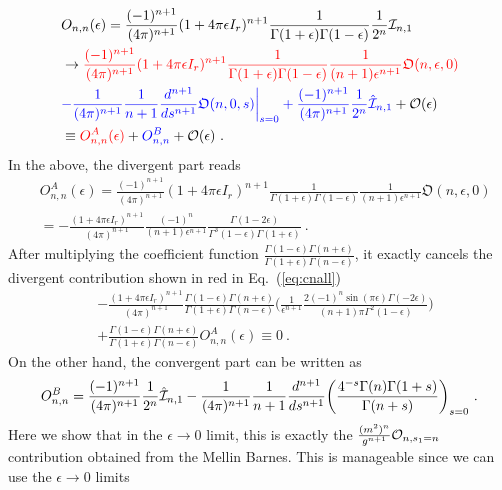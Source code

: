 \documentclass[a4paper,11pt]{article}
\begin{document}
\begin{align}
&O_{n,n}(\epsilon)=\frac{(-1)^{n+1}}{(4\pi)^{n+1}}(1+4\pi \epsilon I_r)^{n+1}\frac{1}{\Gamma(1+\epsilon)\Gamma(1-\epsilon)}\frac{1}{2^n}{\cal I}_{n,1}  \nonumber \ \\
&\rightarrow{\color{red}\frac{(-1)^{n+1}}{(4\pi)^{n+1}}(1+4\pi\epsilon I_r)^{n+1}\frac{1}{\Gamma(1+\epsilon)\Gamma(1-\epsilon)}\frac{1}{(n+1)\epsilon^{n+1}}\mathfrak{O}(n,\epsilon,0) }\nonumber \\ 
&{\color{blue}-\frac{1}{(4\pi)^{n+1}}\frac{1}{n+1}\frac{d^{n+1}}{ds^{n+1}}\mathfrak{O}(n,0,s)\bigg|_{s=0} +\frac{(-1)^{n+1}}{(4\pi)^{n+1}}\frac{1}{2^n}\hat {\cal I}_{n,1} }+{\cal O}(\epsilon)\nonumber \\ 
&\equiv {\color{red} O^A_{n,n}(\epsilon)}+{\color{blue}O^B_{n,n}}+{\cal O}(\epsilon) \ .
\end{align}
In the above, the divergent part reads
\begin{align}
&O_{n,n}^A(\epsilon)=\frac{(-1)^{n+1}}{(4\pi)^{n+1}}(1+4\pi\epsilon I_r)^{n+1}\frac{1}{\Gamma(1+\epsilon)\Gamma(1-\epsilon)}\frac{1}{(n+1)\epsilon^{n+1}}\mathfrak{O}(n,\epsilon,0)\nonumber \\ 
&=-\frac{(1+4\pi\epsilon I_r)^{n+1}}{(4\pi)^{n+1}}\frac{(-1)^n}{(n+1)\epsilon^{n+1}}\frac{\Gamma(1-2\epsilon)}{\Gamma^3(1-\epsilon)\Gamma(1+\epsilon)} \ .
\end{align}
After multiplying the coefficient function $\frac{\Gamma(1-\epsilon)\Gamma(n+\epsilon)}{\Gamma(1+\epsilon)\Gamma(n-\epsilon)}$, it exactly cancels the divergent contribution shown in red in Eq.~(\ref{eq:cnall}) 
\begin{align}
&-\frac{(1+4\pi\epsilon I_r)^{n+1}}{(4\pi)^{n+1}}\frac{\Gamma(1-\epsilon)\Gamma(n+\epsilon)}{\Gamma(1+\epsilon)\Gamma(n-\epsilon)}\bigg(\frac{1}{\epsilon^{n+1}}\frac{2 (-1)^n  \sin (\pi  \epsilon) \Gamma (-2 \epsilon)}{(n+1)\pi \Gamma^2 (1-\epsilon)}\bigg) \nonumber \\
&+\frac{\Gamma(1-\epsilon)\Gamma(n+\epsilon)}{\Gamma(1+\epsilon)\Gamma(n-\epsilon)}O^A_{n,n}(\epsilon) \equiv 0 \ .
\end{align}
On the other hand, the convergent part can be written as
\begin{align}
O_{n,n}^B=\frac{(-1)^{n+1}}{(4\pi)^{n+1}}\frac{1}{2^n}\hat {\cal I}_{n,1}-\frac{1}{(4\pi)^{n+1}}\frac{1}{n+1}\frac{d^{n+1}}{ds^{n+1}}\bigg(\frac{4^{-s}\Gamma(n)\Gamma(1+s)}{\Gamma(n+s)}\bigg)_{s=0} \ .
\end{align}
Here we show that in the $\epsilon \rightarrow 0$ limit, this is exactly the $\frac{(m^2)^n}{g^{n+1}}{\cal O}_{n,s_1=n}$ contribution obtained from the Mellin Barnes.  This is manageable since we can use the $\epsilon\rightarrow0$ limits
\end{document}
